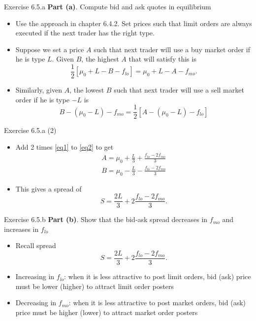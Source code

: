 \documentclass[english,10pt]{beamer}
\begin{document}
\begin{frame}{Exercise 6.5.a}
	\textbf{Part (a)}. Compute bid and ask quotes in equilibrium
	\smallskip
	\smallskip
	\begin{itemize}
		\item Use the approach in chapter 6.4.2. Set prices such that limit orders are always executed if the next trader has the right type.
		\item Suppose we set a price $A$ such that next trader will use a buy market order if he is type $L$. Given $B$, the highest $A$ that will satisfy this is
		\begin{equation}\label{eq1}
		\frac{1}{2}[\mu_0+L-B-f_{lo}]=\mu_0+L-A-f_{mo}.
		\end{equation}
		\item Similarly, given $A$, the lowest $B$ such that next trader will use a sell market order if he is type $-L$ is
		\begin{equation} \label{eq2}
		B-(\mu_0-L)-f_{mo}=\frac{1}{2}[A-(\mu_0-L)-f_{lo}]
		\end{equation}
	\end{itemize}
\end{frame}


\begin{frame}{Exercise 6.5.a (2)}
	\begin{itemize}
		\item Add 2 times \eqref{eq1} to \eqref{eq2} to get
		\begin{align*}
		A=\mu_0+\frac{L}{3}+\frac{f_{lo}-2f_{mo}}{3}\\
		B=\mu_0-\frac{L}{3}-\frac{f_{lo}-2f_{mo}}{3}
		\end{align*}
		\item This gives a spread of
		\[
		S=\frac{2L}{3}+2\frac{f_{lo}-2f_{mo}}{3}.
		\]
	\end{itemize}
\end{frame}


\begin{frame}{Exercise 6.5.b}
	\textbf{Part (b)}. Show that the bid-ask spread decreases in $f_{mo}$ and increases in $f_{lo}$
	\smallskip
	\smallskip
	\begin{itemize}
		\item Recall spread
		\[
		S=\frac{2L}{3}+2\frac{f_{lo}-2f_{mo}}{3}.
		\]
		\item Increasing in $f_{lo}$: when it is less attractive to post limit orders, bid (ask) price must be lower (higher) to attract limit order posters
		\item Decreasing in $f_{mo}$: when it is less attractive to post market orders, bid (ask) price must be higher (lower) to attract market order posters
	\end{itemize}
\end{frame}
\end{document}
